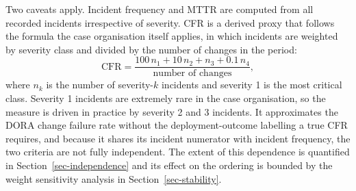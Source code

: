 \documentclass[
  journal,
]{IEEEtran}%
\begin{document}
\begin{table}

\caption{\label{tbl-indicators-def}Operational indicator definitions}


\end{table}%

Two caveats apply. Incident frequency and MTTR are computed from all
recorded incidents irrespective of severity. CFR is a derived proxy that
follows the formula the case organisation itself applies, in which
incidents are weighted by severity class and divided by the number of
changes in the period: \begin{equation}\label{eq:cfr}
\text{CFR} = \frac{100\,n_1 + 10\,n_2 + n_3 + 0.1\,n_4}{\text{number of changes}},
\end{equation} where \(n_k\) is the number of severity-\(k\) incidents
and severity 1 is the most critical class. Severity 1 incidents are
extremely rare in the case organisation, so the measure is driven in
practice by severity 2 and 3 incidents. It approximates the DORA change
failure rate without the deployment-outcome labelling a true CFR
requires, and because it shares its incident numerator with incident
frequency, the two criteria are not fully independent. The extent of
this dependence is quantified in Section~\ref{sec-independence} and its
effect on the ordering is bounded by the weight sensitivity analysis in
Section~\ref{sec-stability}.
\end{document}
